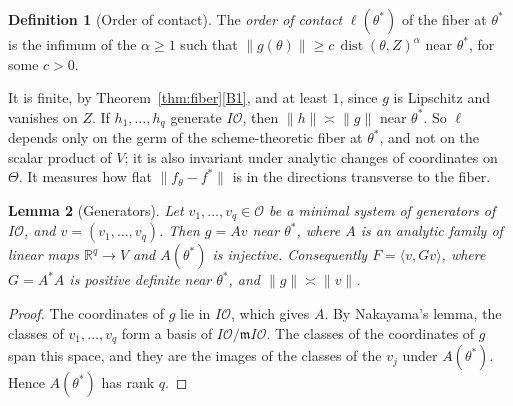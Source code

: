 \documentclass[11pt]{article}
\newtheorem{lemma}{Lemma}
\theoremstyle{definition}
\newtheorem{definition}[lemma]{Definition}
\theoremstyle{remark}
\newcommand{\R}{\mathbb{R}}
\newcommand{\cO}{\mathcal{O}}
\newcommand{\fm}{\mathfrak{m}}
\newcommand{\ip}[2]{\langle #1,#2\rangle}
\DeclareMathOperator{\dist}{dist}
\begin{document}
\begin{definition}[Order of contact]\label{def:contact}
The \emph{order of contact} $\ell(\theta^*)$ of the fiber at $\theta^*$ is the infimum of the $\alpha\ge1$ such that $\|g(\theta)\|\ge c\,\dist(\theta,Z)^\alpha$ near $\theta^*$, for some $c>0$.
\end{definition}

It is finite, by Theorem~\ref{thm:fiber}\ref{B1}, and at least $1$, since $g$ is Lipschitz and vanishes on $Z$. If $h_1,\dots,h_q$ generate $I\cO$, then $\|h\|\asymp\|g\|$ near $\theta^*$. So $\ell$ depends only on the germ of the scheme-theoretic fiber at $\theta^*$, and not on the scalar product of $V$; it is also invariant under analytic changes of coordinates on $\Theta$. It measures how flat $\|f_\theta-f^*\|$ is in the directions transverse to the fiber.

\begin{lemma}[Generators]\label{lem:generators}
Let $v_1,\dots,v_q\in\cO$ be a minimal system of generators of $I\cO$, and $v=(v_1,\dots,v_q)$. Then $g=Av$ near $\theta^*$, where $A$ is an analytic family of linear maps $\R^q\to V$ and $A(\theta^*)$ is injective. Consequently $F=\ip{v}{Gv}$, where $G=A^*A$ is positive definite near $\theta^*$, and $\|g\|\asymp\|v\|$.
\end{lemma}

\begin{proof}
The coordinates of $g$ lie in $I\cO$, which gives $A$. By Nakayama's lemma, the classes of $v_1,\dots,v_q$ form a basis of $I\cO/\fm I\cO$. The classes of the coordinates of $g$ span this space, and they are the images of the classes of the $v_j$ under $A(\theta^*)$. Hence $A(\theta^*)$ has rank $q$.
\end{proof}
\end{document}
